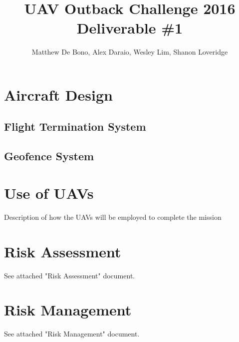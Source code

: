 \documentclass[]{article}
\title{UAV Outback Challenge 2016\\ \large Deliverable \#1\\}
\author{
	Matthew De Bono,
	Alex Daraio,
	Wesley Lim,
	Shanon Loveridge}
\begin{document}
\maketitle

\section{Aircraft Design}
\subsection{Flight Termination System}


\subsection{Geofence System}


\section{Use of UAVs}
Description of how the UAVs will be employed to complete the mission

\section{Risk Assessment}
See attached "Risk Assessment" document.

\section{Risk Management}
See attached "Risk Management" document.
\end{document}
